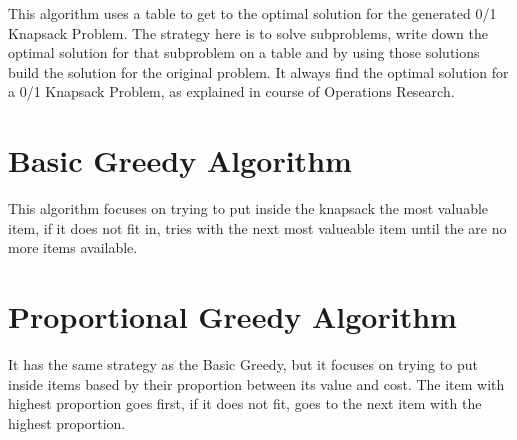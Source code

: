 This algorithm uses a table to get to the optimal solution for the generated 0/1 Knapsack Problem. The strategy here is to solve
subproblems, write down the optimal solution for that subproblem on a table and by using those solutions build the solution 
for the original problem. It always find the optimal solution for a 0/1 Knapsack Problem, as explained in course of Operations Research.

\section*{Basic Greedy Algorithm}

This algorithm focuses on trying to put inside the knapsack the most valuable item, if it does not fit in, tries with the next
most valueable item until the are no more items available.

\section*{Proportional Greedy Algorithm}

It has the same strategy as the Basic Greedy, but it focuses on trying to put inside items based by their proportion between its
value and cost. The item with highest proportion goes first, if it does not fit, goes to the next item with the highest proportion.

